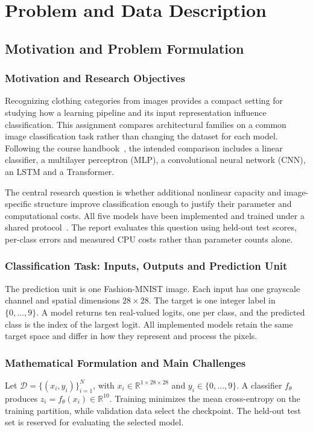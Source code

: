 \section{Problem and Data Description}
\label{sec:data}

\subsection{Motivation and Problem Formulation}
\subsubsection{Motivation and Research Objectives}
Recognizing clothing categories from images provides a compact setting for studying how a learning pipeline and its input representation influence classification. This assignment compares architectural families on a common image classification task rather than changing the dataset for each model. Following the course handbook~\cite{handbook}, the intended comparison includes a linear classifier, a multilayer perceptron (MLP), a convolutional neural network (CNN), an LSTM and a Transformer.

The central research question is whether additional nonlinear capacity and image-specific structure improve classification enough to justify their parameter and computational costs. All five models have been implemented and trained under a shared protocol~\cite{code}. The report evaluates this question using held-out test scores, per-class errors and measured CPU costs rather than parameter counts alone.

\subsubsection{Classification Task: Inputs, Outputs and Prediction Unit}
The prediction unit is one Fashion-MNIST image. Each input has one grayscale channel and spatial dimensions $28\times28$. The target is one integer label in $\{0,\ldots,9\}$. A model returns ten real-valued logits, one per class, and the predicted class is the index of the largest logit. All implemented models retain the same target space and differ in how they represent and process the pixels.

\subsubsection{Mathematical Formulation and Main Challenges}
Let $\mathcal{D}=\{(x_i,y_i)\}_{i=1}^{N}$, with $x_i\in\mathbb{R}^{1\times28\times28}$ and $y_i\in\{0,\ldots,9\}$. A classifier $f_{\theta}$ produces $z_i=f_{\theta}(x_i)\in\mathbb{R}^{10}$. Training minimizes the mean cross-entropy on the training partition, while validation data select the checkpoint. The held-out test set is reserved for evaluating the selected model.

